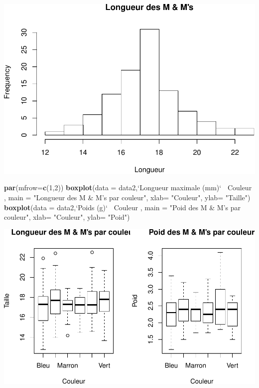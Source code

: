 \documentclass[]{article}
\newenvironment{Shaded}{\begin{snugshade}}{\end{snugshade}}
\newcommand{\KeywordTok}[1]{\textcolor[rgb]{0.13,0.29,0.53}{\textbf{#1}}}
\newcommand{\DataTypeTok}[1]{\textcolor[rgb]{0.13,0.29,0.53}{#1}}
\newcommand{\DecValTok}[1]{\textcolor[rgb]{0.00,0.00,0.81}{#1}}
\newcommand{\StringTok}[1]{\textcolor[rgb]{0.31,0.60,0.02}{#1}}
\newcommand{\OperatorTok}[1]{\textcolor[rgb]{0.81,0.36,0.00}{\textbf{#1}}}
\newcommand{\NormalTok}[1]{#1}
\begin{document}
\includegraphics{TD1_files/figure-latex/unnamed-chunk-22-1.pdf}

\begin{Shaded}
\begin{Highlighting}[]
\KeywordTok{par}\NormalTok{(}\DataTypeTok{mfrow=}\KeywordTok{c}\NormalTok{(}\DecValTok{1}\NormalTok{,}\DecValTok{2}\NormalTok{))}
\KeywordTok{boxplot}\NormalTok{(}\DataTypeTok{data =}\NormalTok{ data2,}\StringTok{`}\DataTypeTok{Longueur maximale (mm)}\StringTok{`}\OperatorTok{~}\StringTok{ }\NormalTok{Couleur , }
        \DataTypeTok{main =} \StringTok{"Longueur des M & M's par couleur"}\NormalTok{,}
        \DataTypeTok{xlab=} \StringTok{"Couleur"}\NormalTok{, }\DataTypeTok{ylab=} \StringTok{"Taille"}\NormalTok{)}
\KeywordTok{boxplot}\NormalTok{(}\DataTypeTok{data =}\NormalTok{ data2,}\StringTok{`}\DataTypeTok{Poids (g)}\StringTok{`}\OperatorTok{~}\StringTok{ }\NormalTok{Couleur , }
        \DataTypeTok{main =} \StringTok{"Poid des M & M's par couleur"}\NormalTok{, }
        \DataTypeTok{xlab=} \StringTok{"Couleur"}\NormalTok{, }\DataTypeTok{ylab=} \StringTok{"Poid"}\NormalTok{)}
\end{Highlighting}
\end{Shaded}

\includegraphics{TD1_files/figure-latex/unnamed-chunk-23-1.pdf}
\end{document}
